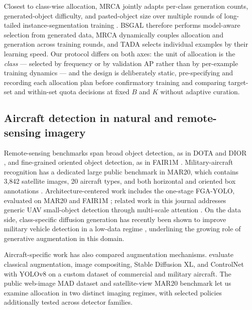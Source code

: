 \documentclass[preprint,12pt,authoryear]{elsarticle}
\begin{document}
Closest to class-wise allocation, MRCA jointly adapts per-class generation
counts, generated-object difficulty, and pasted-object size over multiple
rounds of long-tailed instance-segmentation training
\citep{kim2025mrca}. BSGAL therefore performs model-aware selection from
generated data, MRCA dynamically couples allocation and generation
across training rounds, and TADA selects individual examples by their
learning speed. Our protocol differs on both axes: the unit of
allocation is the \emph{class} --- selected by frequency or by
validation AP rather than by per-example training dynamics --- and the
design is deliberately static, pre-specifying and recording each
allocation plan before confirmatory training and comparing target-set
and within-set quota decisions at fixed $B$ and $K$ without adaptive
curation.

\subsection{Aircraft detection in natural and remote-sensing imagery}
Remote-sensing benchmarks span broad object detection, as in DOTA
\citep{xia2018dota} and DIOR \citep{li2020dior}, and fine-grained
oriented object detection, as in FAIR1M \citep{sun2022fair1m}. Military-aircraft
recognition has a dedicated large public benchmark in MAR20, which
contains 3{,}842 satellite images, 20 aircraft types, and both horizontal
and oriented box annotations \citep{yu2023mar20}. Architecture-centered
work includes the one-stage FGA-YOLO, evaluated on MAR20 and FAIR1M
\citep{wu2025fga}; related work in this journal addresses generic UAV
small-object detection through multi-scale attention
\citep{song2024small}. On the data side, class-specific diffusion
generation has recently been shown to improve military vehicle
detection in a low-data regime \citep{fokkinga2026military},
underlining the growing role of generative augmentation in this
domain.

Aircraft-specific work has also compared augmentation mechanisms.
\citet{shermaine2025compositing} evaluate classical augmentation, image
compositing, Stable Diffusion XL, and ControlNet with YOLOv8 on a custom
dataset of commercial and military aircraft. The public web-image MAD
dataset \citep{rookieengg2023mad} and satellite-view MAR20 benchmark
let us examine allocation in
two distinct imaging regimes, with selected policies additionally tested
across detector families.
\end{document}
